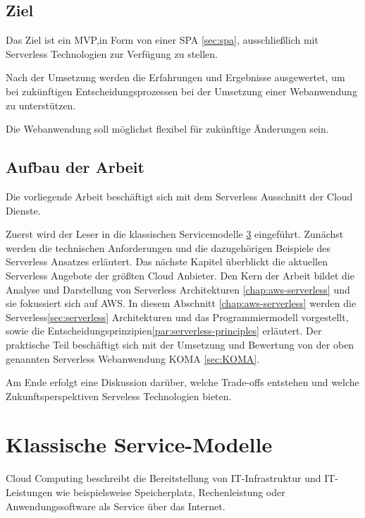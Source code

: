 \documentclass[
12pt,
english,
ngerman,
headsepline,
twoside,
openright,
numbers=noenddot,version=first
]{scrreprt}
\begin{document}
\section{Ziel}
\label{sec:task}
Das Ziel ist ein \acrfull{MVP},in Form von einer \acrfull{SPA} \ref{sec:spa}, ausschließlich mit Serverless Technologien zur Verfügung zu stellen.

Nach der Umsetzung werden die Erfahrungen und Ergebnisse ausgewertet, um bei zukünftigen Entscheidungsprozessen bei der Umsetzung einer Webanwendung zu unterstützen.

Die Webanwendung soll möglichst flexibel für zukünftige Änderungen sein.

\section{Aufbau der Arbeit}
\label{sec:layout}

Die vorliegende Arbeit beschäftigt sich mit dem Serverless Ausschnitt der Cloud Dienste. 

Zuerst wird der Leser in die klassischen Servicemodelle \ref{chap:service-models} eingeführt. Zunächst werden die technischen Anforderungen und die dazugehörigen Beispiele des Serverless Ansatzes erläutert.
Das nächste Kapitel überblickt die aktuellen Serverless Angebote der größten Cloud Anbieter.
Den Kern der Arbeit bildet die Analyse und Darstellung von Serverless Architekturen \ref{chap:aws-serverless} und sie fokussiert sich auf \acrfull{AWS}. In diesem Abschnitt \ref{chap:aws-serverless} werden die Serverless\ref{sec:serverless} Architekturen und das Programmiermodell vorgestellt, sowie die Entscheidungsprinzipien\ref{par:serverless-principles} erläutert.
Der praktische Teil beschäftigt sich mit der Umsetzung und Bewertung von der oben genannten Serverless Webanwendung KOMA \ref{sec:KOMA}.

Am Ende erfolgt eine Diskussion darüber, welche Trade-offs entstehen und welche Zukunftsperspektiven Serveless Technologien bieten.


\chapter{Klassische Service-Modelle}
\label{chap:service-models}
\label{chap:principles}
Cloud Computing beschreibt die Bereitstellung von IT-Infrastruktur und IT-Leistungen wie beispielsweise Speicherplatz, Rechenleistung oder Anwendungssoftware als Service über das Internet.
\end{document}
